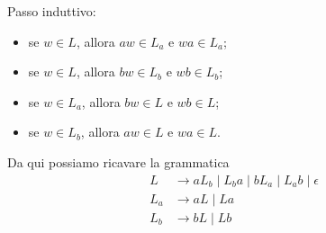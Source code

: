 \documentclass[12pt, answers]{exam}
\begin{document}
\begin{questions}
\begin{solution}
		Passo induttivo:
		\begin{itemize}
			\item se $w \in L$, allora $aw \in L_a$ e $wa \in L_a$;
			\item se $w \in L$, allora $bw \in L_b$ e $wb \in L_b$;
			\item se $w \in L_a$, allora $bw \in L$ e $wb \in L$;
			\item se $w \in L_b$, allora $aw \in L$ e $wa \in L$.
		\end{itemize}
		Da qui possiamo ricavare la grammatica
		\begin{align*}
			L   &\rightarrow a L_b \mid L_b a \mid b L_a \mid L_a b \mid \epsilon \\
			L_a &\rightarrow a L \mid L a \\
			L_b &\rightarrow b L \mid L b 
		\end{align*}
	\end{solution}
\end{questions}
\end{document}
